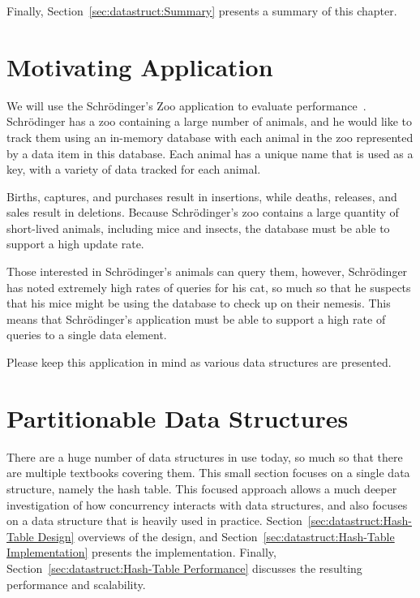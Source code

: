 Finally, Section~\ref{sec:datastruct:Summary}
presents a summary of this chapter.

\section{Motivating Application}
\label{sec:datastruct:Motivating Application}

We will use the Schr\"odinger's Zoo application to evaluate
performance~\cite{McKenney:2013:SDS:2483852.2483867}.
Schr\"odinger has a zoo containing a large number of animals, and
he would like to track them using an in-memory database with
each animal in the zoo represented by a data item in this database.
Each animal has a unique name that is used as a key, with a variety
of data tracked for each animal.

Births, captures, and purchases result in insertions, while deaths,
releases, and sales result in deletions.
Because Schr\"odinger's zoo contains a large quantity of short-lived
animals, including mice and insects, the database must be able to
support a high update rate.

Those interested in Schr\"odinger's animals can query them, however,
Schr\"odinger has noted extremely high rates of queries for his cat,
so much so that he suspects that his mice might be using the database
to check up on their nemesis.
This means that Schr\"odinger's application must be able to support a
high rate of queries to a single data element.

Please keep this application in mind as various data structures are presented.

\section{Partitionable Data Structures}
\label{sec:datastruct:Partitionable Data Structures}

There are a huge number of data structures in use today, so much so
that there are multiple textbooks covering them.
This small section focuses
on a single data structure, namely the hash table.
This focused approach allows a much deeper investigation of how concurrency
interacts with data structures, and also focuses on a data structure
that is heavily used in practice.
Section~\ref{sec:datastruct:Hash-Table Design}
overviews of the design, and
Section~\ref{sec:datastruct:Hash-Table Implementation}
presents the implementation.
Finally,
Section~\ref{sec:datastruct:Hash-Table Performance}
discusses the resulting performance and scalability.

